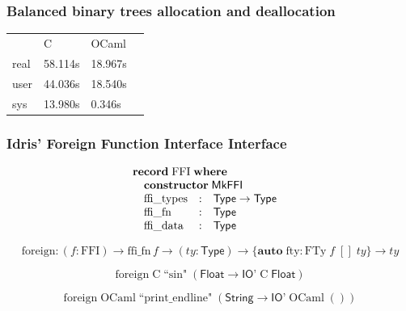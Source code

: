 \documentclass[aspectratio=169]{beamer}
\begin{document}
\begin{frame}
  \frametitle{Balanced binary trees allocation and deallocation}
  \centering
  \begin{tabular}{llll}
         & C       & OCaml   & \\
    real & 58.114s & 18.967s & \\
    user & 44.036s & 18.540s & \\
    sys  & 13.980s & 0.346s  &
  \end{tabular}
\end{frame}


\begin{frame}[t]
  \frametitle{Idris' Foreign Function Interface Interface}

  \begin{displaymath}
    \begin{array}{@{}l}
      \textbf{record}\;\mathrm{FFI}\;\textbf{where} \\
      \quad \textbf{constructor}\;\textsf{MkFFI} \\
      \quad
      \begin{array}{@{}lcl}
        \mathrm{ffi\_types}&:&\textsf{Type} \to \textsf{Type} \\
        \mathrm{ffi\_fn}&:&\textsf{Type} \\
        \mathrm{ffi\_data}&:&\textsf{Type}
      \end{array}
    \end{array}
  \end{displaymath}

  \bigskip
  \pause

  \begin{displaymath}
    \mathrm{foreign} : (f : \mathrm{FFI}) \to \mathrm{ffi\_fn}\,f \to (\mathit{ty} : \textsf{Type}) \to \{\textbf{auto}\;\mathrm{fty} : \mathrm{FTy}\;f\;[]\;\mathit{ty}\} \to \mathit{ty}
  \end{displaymath}

  \bigskip
  \pause

  \begin{displaymath}
    \mathrm{foreign}\;\mathrm{C}\;\textrm{``sin"}\;(\textsf{Float} \to \textsf{IO'}\;\mathrm{C}\;\textsf{Float})
  \end{displaymath}

  \pause

  \begin{displaymath}
    \mathrm{foreign}\;\mathrm{OCaml}\;\textrm{``print\_endline"}\;(\textsf{String} \to \textsf{IO'}\;\mathrm{OCaml}\;())
  \end{displaymath}
\end{frame}
\end{document}
